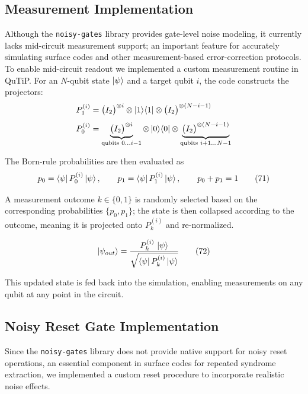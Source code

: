 \documentclass[9pt,a4paper,twocolumn,twoside]{tau-class/tau}
\begin{document}
\subsection{Measurement Implementation}
Although the \texttt{noisy-gates} library provides gate-level noise modeling, it currently lacks mid-circuit measurement support; an important feature for accurately simulating surface codes and other measurement-based error-correction protocols\cite{quantum_gates_repo}.\\
To enable mid-circuit readout we implemented a custom measurement routine in QuTiP. For an \(N\)-qubit state \(\ket{\psi}\) and a target qubit \(i\), the code constructs the projectors:
\begin{align}
    P^{(i)}_{1} &= \bigl(I_{2}\bigr)^{\otimes i}\otimes\ket{1}\!\bra{1}\otimes\bigl(I_{2}\bigr)^{\otimes (N-i-1)} \\[4pt]
P^{(i)}_{0} &= \underbrace{\bigl(I_{2}\bigr)^{\otimes i}}_{\text{qubits }0\ldots i-1}
             \otimes\ket{0}\!\bra{0}
             \otimes\underbrace{\bigl(I_{2}\bigr)^{\otimes (N-i-1)}}_{\text{qubits }i+1\ldots N-1}
\end{align}

The Born-rule probabilities are then evaluated as
\begin{equation}
p_{0}= \bra{\psi} P^{(i)}_{0} \ket{\psi},
\qquad
p_{1}= \bra{\psi} P^{(i)}_{1} \ket{\psi},
\qquad
p_{0}+p_{1}=1
\tag{71}
\end{equation}

A measurement outcome \(k \in \{0,1\}\) is randomly selected based on the corresponding probabilities \(\{p_0, p_1\}\); the state is then collapsed according to the outcome, meaning it is projected onto \(P^{(i)}_k\) and re-normalized.

\begin{equation}
\ket{\psi_{out}} = 
\frac{P^{(i)}_{k}\,\ket{\psi}}{\sqrt{\bra{\psi}P^{(i)}_{k}\ket{\psi}}}
\tag{72}
\end{equation}

This updated state is fed back into the simulation, enabling measurements on any qubit at any point in the circuit.

\subsection{Noisy Reset Gate Implementation}
Since the \texttt{noisy-gates} library does not provide native support for noisy reset operations, an essential component in surface codes for repeated syndrome extraction, we implemented a custom reset procedure to incorporate realistic noise effects\cite{quantum_gates_repo}.
\end{document}
